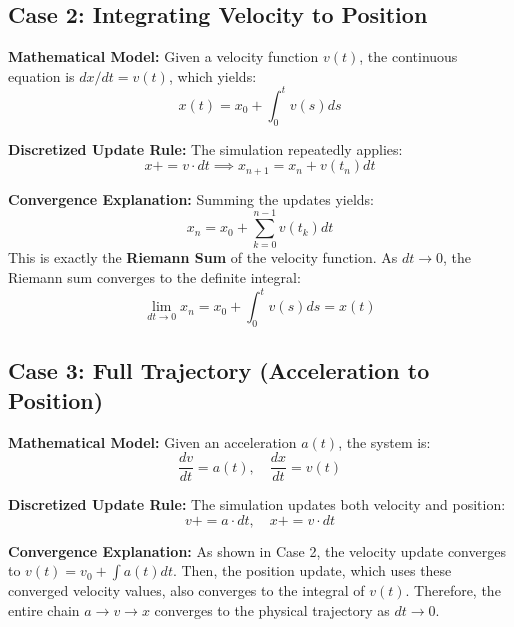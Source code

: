 \subsection*{Case 2: Integrating Velocity to Position}

\textbf{Mathematical Model:}
Given a velocity function $v(t)$, the continuous equation is $dx/dt = v(t)$, which yields:
\[
x(t) = x_0 + \int_0^t v(s) ds
\]

\textbf{Discretized Update Rule:}
The simulation repeatedly applies:
\[
x += v \cdot dt \implies x_{n+1} = x_n + v(t_n) dt
\]

\textbf{Convergence Explanation:}
Summing the updates yields:
\[
x_n = x_0 + \sum_{k=0}^{n-1} v(t_k) dt
\]
This is exactly the \textbf{Riemann Sum} of the velocity function. As $dt \to 0$, the Riemann sum converges to the definite integral:
\[
\lim_{dt \to 0} x_n = x_0 + \int_0^t v(s) ds = x(t)
\]

\subsection*{Case 3: Full Trajectory (Acceleration to Position)}

\textbf{Mathematical Model:}
Given an acceleration $a(t)$, the system is:
\[
\frac{dv}{dt} = a(t), \quad \frac{dx}{dt} = v(t)
\]

\textbf{Discretized Update Rule:}
The simulation updates both velocity and position:
\[
v += a \cdot dt, \quad x += v \cdot dt
\]

\textbf{Convergence Explanation:}
As shown in Case 2, the velocity update converges to $v(t) = v_0 + \int a(t) dt$. Then, the position update, which uses these converged velocity values, also converges to the integral of $v(t)$. Therefore, the entire chain $a \to v \to x$ converges to the physical trajectory as $dt \to 0$.
